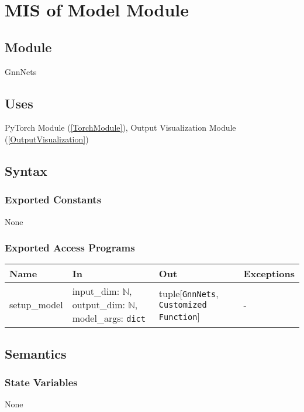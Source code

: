 \documentclass[12pt, titlepage]{article}
\begin{document}
\newpage




\section{MIS of Model Module} \label{Model}

\subsection{Module}
GnnNets

\subsection{Uses}
PyTorch Module (\ref{TorchModule}), Output Visualization Module (\ref{OutputVisualization})

\subsection{Syntax}

\subsubsection{Exported Constants}
None

\subsubsection{Exported Access Programs}
\begin{center}
\begin{tabular}{p{3.2cm} >{\raggedright\arraybackslash}p{6cm} p{4cm} p{3cm}}
\hline
\textbf{Name} & \textbf{In} & \textbf{Out} & \textbf{Exceptions} \\
\hline
setup\_model & input\_dim: \(\mathbb{N}\), output\_dim: \(\mathbb{N}\), model\_args: \texttt{dict} & tuple[\texttt{GnnNets}, \texttt{Customized Function}] & - \\
\hline
\end{tabular}
\end{center}

\subsection{Semantics}

\subsubsection{State Variables}
None
\end{document}
